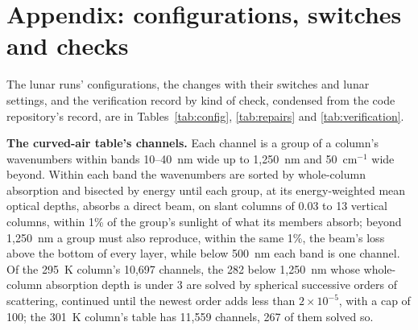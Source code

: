 \section{Appendix: configurations, switches and checks}

The lunar runs' configurations, the changes with their switches and lunar settings, and the verification
record by kind of check, condensed from the code repository's record, are in Tables~\ref{tab:config},
\ref{tab:repairs} and \ref{tab:verification}.

\textbf{The curved-air table's channels.} Each channel is a group of a column's wavenumbers within bands 10--40~nm wide up to 1,250~nm and 50~cm$^{-1}$ wide beyond. Within each band the
wavenumbers are sorted by whole-column absorption and bisected by energy until each group, at its energy-weighted mean optical depths, absorbs a direct beam, on slant columns of 0.03 to 13 vertical columns, within 1\% of the group's
sunlight of what its members absorb; beyond 1,250~nm a group must also reproduce, within the same 1\%, the beam's loss
above the bottom of every layer, while below 500~nm each band is one channel. Of the 295~K column's 10,697 channels, the 282 below
1,250~nm whose whole-column absorption depth is under 3 are solved by spherical successive orders of scattering, continued
until the newest order adds less than $2\times10^{-5}$, with a cap of 100; the 301~K column's table has 11,559
channels, 267 of them solved so.

